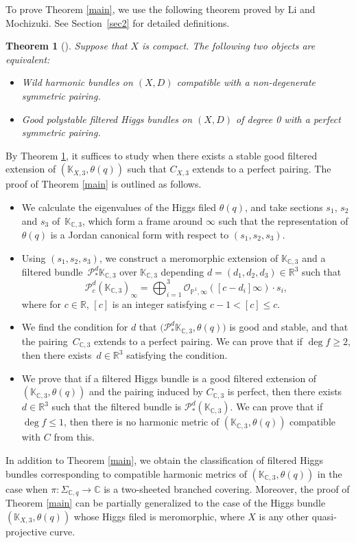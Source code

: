 \documentclass[10pt,a4paper]{amsart}
\numberwithin{equation}{section}
\newtheorem{Theorem}{Theorem}[section]
\newcommand{\C}{\mathbb{C}}
\newcommand{\R}{\mathbb{R}}
\newcommand{\ps}{\mathbb{P}}
\newcommand{\strsheaf}{\mathcal{O}}
\begin{document}
To prove Theorem \ref{main}, we use the following theorem proved by Li and Mochizuki. See Section~\ref{sec2} for detailed definitions.
\begin{Theorem}[\cite{LM1}]\label{correspond}
 Suppose that $X$ is compact. The following two objects are equivalent:
 \begin{itemize}\itemsep=0pt
 \item Wild harmonic bundles on $(X,D)$ compatible with a non-degenerate symmetric pairing.
 \item Good polystable filtered Higgs bundles on $(X,D)$ of degree 0 with a perfect symmetric pairing.
 \end{itemize}
\end{Theorem}
By Theorem \ref{correspond}, it suffices to study when there exists a stable good filtered extension of $(\mathbb{K}_{X,3},\theta(q))$ such that $C_{X,3}$ extends to a perfect pairing. The proof of Theorem \ref{main} is outlined as follows.
\begin{itemize}\itemsep=0pt\setlength{\leftskip}{0.46cm}
 \item[{\bf Step 1}] We calculate the eigenvalues of the Higgs filed $\theta(q)$, and take sections $s_1$, $s_2$ and $s_3$ of~$\mathbb{K}_{\C,3}$, which form a frame around $\infty$ such that the representation of $\theta(q)$ is
 a Jordan canonical form with respect to $(s_1,s_2,s_3)$.
 \item[{\bf Step 2}] Using $(s_1,s_2,s_3)$, we construct a meromorphic extension of $\mathbb{K}_{\C,3}$ and a filtered bundle~$\mathcal{P}^{d}_{*}\mathbb{K}_{\C,3}$ over $\mathbb{K}_{\C,3}$ depending $d=(d_1,d_2,d_3)\in \R^3$ such that
 \begin{equation*}
 \mathcal{P}^{d}_{c}(\mathbb{K}_{\C,3})_{\infty} = \bigoplus_{i=1}^3\strsheaf_{\ps^1,\infty}([c-d_i]\infty)\cdot s_i,
 \end{equation*}
 where for $c\in\R$, $[c]$ is an integer satisfying $c-1<[c]\leq c$.
 \item[{\bf Step 3}] We find the condition for $d$ that $\bigl(\mathcal{P}^{d}_{*}\mathbb{K}_{\C,3},\theta(q)\bigr)$ is good and stable, and that the pairing~$C_{\C,3}$ extends to a perfect pairing. We can prove that if $\deg{f}\geq 2$, then there exists~$d\in\R^3$ satisfying the condition.
 \item[{\bf Step 4}] We prove that if a filtered Higgs bundle is a good filtered extension of $(\mathbb{K}_{\C,3},\theta(q))$ and the pairing induced by $C_{\C,3}$ is perfect, then there exists $d\in\R^3$ such that the filtered bundle is $\mathcal{P}^{d}_{*}(\mathbb{K}_{\C,3})$. We can prove that if $\deg{f}\leq 1$, then there is no harmonic metric of $(\mathbb{K}_{\C,3},\theta(q))$ compatible with $C$ from this.
\end{itemize}
In addition to Theorem \ref{main}, we obtain the classification of filtered Higgs bundles corresponding to compatible harmonic metrics of $(\mathbb{K}_{\C,3},\theta(q))$ in the case when $\pi\colon \Sigma_{\C,q}\to \C$ is a two-sheeted branched covering.
Moreover, the proof of Theorem \ref{main} can be partially generalized to the case of the Higgs bundle $(\mathbb{K}_{X,3},\theta(q))$ whose Higgs filed is meromorphic, where $X$ is any other quasi-projective curve.
\end{document}

